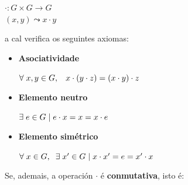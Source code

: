 \documentclass[twoside]{report}
\theoremstyle{mystyle}
\begin{document}
\vspace{2mm}

\begin{center}
    $\cdot : G \times G \longrightarrow G$ \\
    \vspace{2mm}
    \hspace{6mm} $(x,y) \leadsto x \cdot y$
\end{center}  


\vspace{2mm}

\noindent a cal verifica os seguintes axiomas:

\vspace{2mm}

\begin{itemize}
    
    \item \textbf{Asociatividade}
    
    \vspace{1mm}
    
    $\forall \hspace{1mm} x,y \in G, \hspace{3mm} x \cdot (y \cdot z) = (x \cdot y) \cdot z$
    
    \item \textbf{Elemento neutro}
    
    \vspace{1mm}
    
    $\exists \hspace{1mm} e \in G \hspace{1mm} | \hspace{1mm} e \cdot x = x = x \cdot e$
    
    \item \textbf{Elemento simétrico}
    
    \vspace{1mm}
    
    $\forall \hspace{1mm} x \in G, \hspace{2mm} \exists \hspace{1mm} x' \in G \hspace{1mm} | \hspace{1mm} x \cdot x' = e = x' \cdot x$
    
\end{itemize}

\vspace{2mm}

\noindent Se, ademais, a operación $\cdot$  é \textbf{conmutativa}, isto é:
\end{document}
